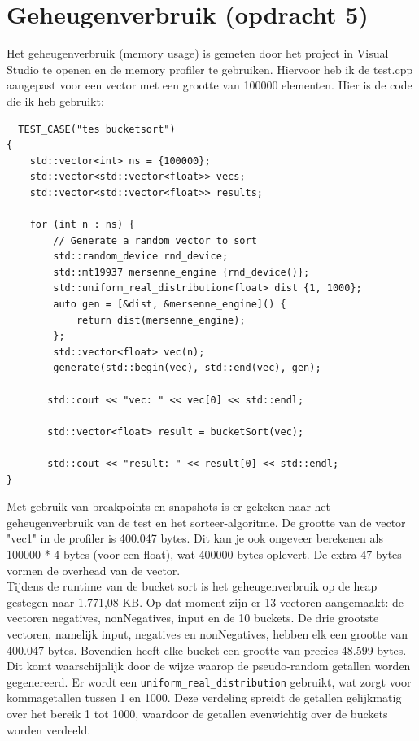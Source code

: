 \documentclass{article}
\begin{document}
\section{Geheugenverbruik (opdracht 5)}
Het geheugenverbruik (memory usage) is gemeten door het project in Visual Studio te openen en de memory profiler te gebruiken. 
Hiervoor heb ik de test.cpp aangepast voor een vector met een grootte van 100000 elementen. Hier is de code die ik heb gebruikt:
\begin{lstlisting}
  TEST_CASE("tes bucketsort")
{
    std::vector<int> ns = {100000};
    std::vector<std::vector<float>> vecs;
    std::vector<std::vector<float>> results;

    for (int n : ns) {
        // Generate a random vector to sort
        std::random_device rnd_device;
        std::mt19937 mersenne_engine {rnd_device()};
        std::uniform_real_distribution<float> dist {1, 1000};
        auto gen = [&dist, &mersenne_engine]() {
            return dist(mersenne_engine);
        };
        std::vector<float> vec(n);
        generate(std::begin(vec), std::end(vec), gen);

       std::cout << "vec: " << vec[0] << std::endl;
       
       std::vector<float> result = bucketSort(vec);
       
       std::cout << "result: " << result[0] << std::endl;
}
\end{lstlisting}
Met gebruik van breakpoints en snapshots is er gekeken naar het geheugenverbruik van de test en het sorteer-algoritme.
De grootte van de vector "vec1" in de profiler is 400.047 bytes. Dit kan je ook ongeveer berekenen als 100000 * 4 bytes (voor een float), wat 400000 bytes oplevert. 
De extra 47 bytes vormen de overhead van de vector. \\

Tijdens de runtime van de bucket sort is het geheugenverbruik op de heap gestegen naar 1.771,08 KB. 
Op dat moment zijn er 13 vectoren aangemaakt: de vectoren negatives, nonNegatives, input en de 10 buckets. 
De drie grootste vectoren, namelijk input, negatives en nonNegatives, hebben elk een grootte van 400.047 bytes. 
Bovendien heeft elke bucket een grootte van precies 48.599 bytes. Dit komt waarschijnlijk door de wijze waarop de pseudo-random getallen worden gegenereerd. 
Er wordt een \texttt{uniform\_real\_distribution} gebruikt, wat zorgt voor kommagetallen tussen 1 en 1000. Deze verdeling spreidt de getallen gelijkmatig over het bereik 1 tot 1000,
waardoor de getallen evenwichtig over de buckets worden verdeeld. \\
\end{document}
